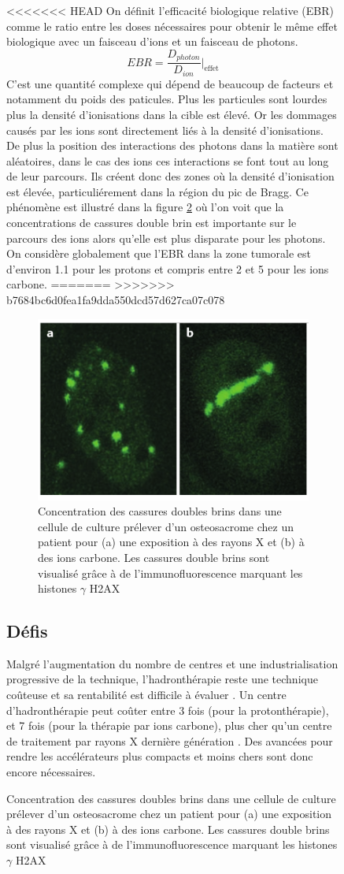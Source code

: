 \documentclass[11pt,a4paper,oldfontcommands]{memoir}
\begin{document}
\begin{figure}
<<<<<<< HEAD
On définit l'efficacité biologique relative (EBR) comme le ratio entre les doses nécessaires pour obtenir le même effet biologique avec un faisceau d'ions et un faisceau de photons.
$$EBR = \frac{D_{photon}}{D_{ion}}\bigg|_{\text{effet}}$$
C'est une quantité complexe qui dépend de beaucoup de facteurs et notamment du poids des paticules. Plus les particules sont lourdes plus la densité d'ionisations dans la cible est élevé. Or les dommages causés par les ions sont directement liés à la densité d'ionisations. De plus la position des interactions des photons dans la matière sont aléatoires, dans le cas des ions ces interactions se font tout au long de leur parcours. Ils créent donc des zones où la densité d'ionisation est élevée, particuliérement dans la région du pic de Bragg. Ce phénomène est illustré dans la figure \ref{LET} où l'on voit que la concentrations de cassures double brin est importante sur le parcours des ions alors qu'elle est plus disparate pour les photons. On considère globalement que l'EBR dans la zone tumorale est d'environ 1.1 pour les protons et compris entre 2 et 5 pour les ions carbone\cite{Choi}. 
=======
>>>>>>> b7684bc6d0fea1fa9dda550dcd57d627ca07c078
\begin{figure}
    \centering
    \includegraphics[scale = 0.7]{intro/LETDSS.png}
    \caption{Concentration des cassures doubles brins dans une cellule de culture prélever d'un osteosacrome chez un patient pour (a) une exposition à des rayons X et (b) à des ions carbone. Les cassures double brins sont visualisé grâce à de l'immunofluorescence marquant les histones $ \gamma$ H2AX \cite{Durante2017}}
    \label{LET}
\end{figure}

\subsection{Défis}
Malgré l'augmentation du nombre de centres et une industrialisation progressive de la technique, l'hadronthérapie reste une technique coûteuse et sa rentabilité est difficile à évaluer \cite{LIEVENS2013134}. Un centre d'hadronthérapie peut coûter entre 3 fois (pour la protonthérapie), et 7 fois (pour la thérapie par ions carbone), plus cher qu'un centre de traitement par rayons X dernière génération \cite{Nupecc}. Des avancées pour rendre les accélérateurs plus compacts et moins chers sont donc encore nécessaires.



\end{figure}
\end{document}
